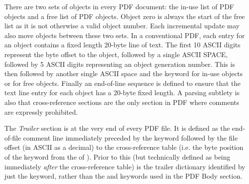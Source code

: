 There are two sets of
objects in every PDF document: the in-use list of PDF objects and a free list
of PDF objects. Object zero is always the start of the free list as it is not
otherwise a valid object number. Each incremental update may also move objects between these two sets.
In a conventional PDF, each entry for an object contains a fixed length 20-byte line of text.
The first 10 ASCII digits represent the byte offset to the object, followed by a single ASCII SPACE, 
followed by 5 ASCII digits representing an object generation number. This is then followed by
another single ASCII space and the keyword  for in-use objects or  for free objects.
Finally an end-of-line sequence is defined to ensure that the text line entry for each object has 
a 20-byte fixed length. A parsing subtlety is also that cross-reference sections are the only section 
in PDF where comments are expressly prohibited.

The \emph{Trailer} section is at the very end of every PDF file. 
It is defined as the end-of-file comment line  immediately
preceded by the  keyword followed by the file offset (in ASCII as a decimal) to 
the cross-reference table (i.e. the byte position of the  keyword 
from the \lstcd{\%} of ). Prior to this (but technically 
defined as being immediately \emph{after} the cross-reference table) is the trailer dictionary
identified by just the  keyword, rather than the  and 
keywords used in the PDF Body section.

